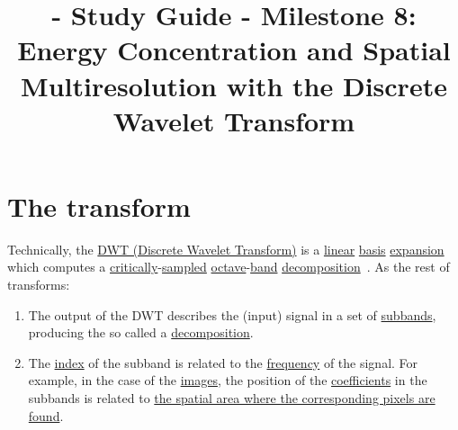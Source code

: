 
\title{\SM{} - Study Guide - Milestone 8: Energy Concentration and Spatial Multiresolution with the Discrete Wavelet Transform}

\maketitle

\tableofcontents

\section{The transform}

Technically, the
\href{https://en.wikipedia.org/wiki/Discrete_wavelet_transform}{DWT
  (Discrete Wavelet Transform)} is a
\href{https://en.wikipedia.org/wiki/Linearity}{linear}
\href{https://en.wikipedia.org/wiki/Change_of_basis}{basis}
\href{https://www.youtube.com/watch?v=P2LTAUO1TdA}{expansion} which
computes a
\href{https://www.dsprelated.com/freebooks/sasp/Critically_Sampled_Perfect_Reconstruction.html}{critically}-\href{https://en.wikipedia.org/wiki/Nyquist-Shannon_sampling_theorem}{sampled}
\href{https://en.wikipedia.org/wiki/Octave_(electronics)}{octave}-\href{https://en.wikipedia.org/wiki/Frequency_band}{band}
\href{https://www.sciencedirect.com/topics/engineering/wavelet-decomposition}{decomposition}~\cite{vetterli2014foundations,kovacevic2013fourier}. As the rest of transforms:
\begin{enumerate}
\item The output of the DWT describes the (input) signal in a set of
  \href{https://en.wikipedia.org/wiki/Sub-band_coding}{subbands},
  producing the so called a
  \href{https://en.wikipedia.org/wiki/Discrete_wavelet_transform}{decomposition}.
\item The
  \href{https://en.wikipedia.org/wiki/Array_data_structure#Element_identifier_and_addressing_formulas}{index}
  of the subband is related to the
  \href{https://en.wikipedia.org/wiki/Frequency}{frequency} of the
  signal. For example, in the case of the
  \href{https://en.wikipedia.org/wiki/Digital_image}{images}, the
  position of the
  \href{https://en.wikipedia.org/wiki/Coefficient}{coefficients} in
  the subbands is related to
  \href{https://en.wikipedia.org/wiki/Discrete_wavelet_transform#/media/File:Jpeg2000_2-level_wavelet_transform-lichtenstein.png}{the
    spatial area where the corresponding pixels are found}.
\end{enumerate}

